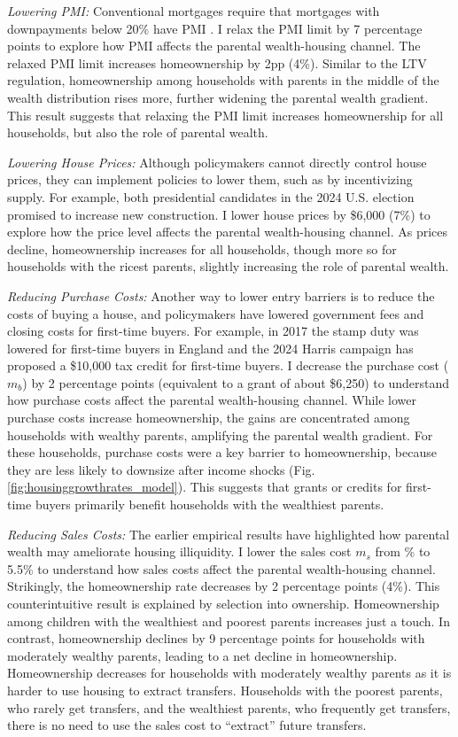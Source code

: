 \documentclass[12pt]{article}
\begin{document}
\textit{Lowering PMI:} Conventional mortgages require that mortgages with downpayments below 20\% have PMI \cite{goodman2017sixty}. I relax the PMI limit by 7 percentage points to explore how PMI affects the parental wealth-housing channel. The relaxed PMI limit increases homeownership by 2pp (4\%). Similar to the LTV regulation, homeownership among households with parents in the middle of the wealth distribution rises more, further widening the parental wealth gradient. This result suggests that relaxing the PMI limit increases homeownership for all households, but also the role of parental wealth.

\textit{Lowering House Prices:} Although policymakers cannot directly control house prices, they can implement policies to lower them, such as by incentivizing supply. For example, both presidential candidates in the 2024 U.S. election promised to increase new construction. I lower house prices by \$6,000 (7\%) to explore how the price level affects the parental wealth-housing channel. As prices decline, homeownership increases for all households, though more so for households with the ricest parents, slightly increasing the role of parental wealth.

\textit{Reducing Purchase Costs:} Another way to lower entry barriers is to reduce the costs of buying a house, and policymakers have lowered government fees and closing costs for first-time buyers. For example, in 2017 the stamp duty was lowered for first-time buyers in England and the 2024 Harris campaign has proposed a \$10,000 tax credit for first-time buyers. I decrease the purchase cost ($m_b$) by 2 percentage points (equivalent to a grant of about \$6,250) to understand how purchase costs affect the parental wealth-housing channel. While lower purchase costs increase homeownership, the gains are concentrated among households with wealthy parents, amplifying the parental wealth gradient. For these households, purchase costs were a key barrier to homeownership, because they are less likely to downsize after income shocks (Fig. \ref{fig:housinggrowthrates_model}). This suggests that grants or credits for first-time buyers primarily benefit households with the wealthiest parents.

\textit{Reducing Sales Costs:} The earlier empirical results have highlighted how parental wealth may ameliorate housing illiquidity. I lower the sales cost $m_s$ from \parms\% to 5.5\% to understand how sales costs affect the parental wealth-housing channel. Strikingly, the homeownership rate decreases by 2 percentage points (4\%). This counterintuitive result is explained by selection into ownership. Homeownership among children with the wealthiest and poorest parents increases just a touch. In contrast, homeownership declines by 9 percentage points for households with moderately wealthy parents, leading to a net decline in homeownership. Homeownership decreases for households with moderately wealthy parents as it is harder to use housing to extract transfers. Households with the poorest parents, who rarely get transfers, and the wealthiest parents, who frequently get transfers, there is no need to use the sales cost to ``extract'' future transfers.
\end{document}
